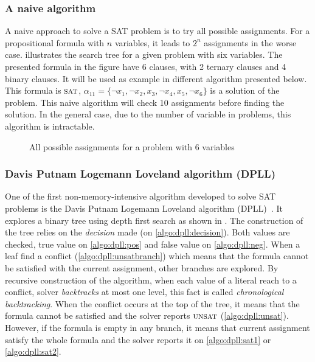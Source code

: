 \subsubsection{A naive algorithm}
A naive approach to solve a SAT problem is to try all possible assignments.
For a propositional formula with $n$ variables, it leads to $2^n$ assignments in the worse case.  
 illustrates the search tree for a given problem with six variables.
The presented formula in the figure have 6 clauses, with 2 ternary clauses and 4 binary clauses.
It will be used as example in different algorithm presented below. This formula is $\textsc{sat}$,
$\alpha_{11} = \{\neg x_1, \neg x_2, x_3, \neg x_4, x_5, \neg x_6 \}$ is a solution of the problem.
This naive algorithm will check 10 assignments before finding the solution. 
In the general case, due to the number of variable in problems, this algorithm is intractable.

\begin{figure}[!htbp]
 \centering
 
 \caption{All possible assignments for a problem with 6 variables}
 \label{fig:naive_algo}
\end{figure}

\subsubsection{Davis Putnam Logemann Loveland algorithm (DPLL)}\label{sec:dpll}
One of the first non-memory-intensive algorithm developed to solve SAT problems is 
the Davis Putnam Logemann Loveland algorithm (DPLL)~\cite{dpll_62}. 
It explores a binary tree using depth first search as shown in .
The construction of the tree  relies on the \emph{decision} made (on \cref{algo:dpll:decision}). Both values
are checked, true value on \cref{algo:dpll:pos} and false value on \cref{algo:dpll:neg}.
When a leaf find a conflict (\cref{algo:dpll:unsatbranch}) which means that the formula cannot be satisfied with
the current assignment, other branches are explored.
By recursive construction of the algorithm, when each value of a literal reach to a conflict,
solver \emph{backtracks} at most one level, this fact is called \emph{chronological backtracking}.
When the conflict occurs at the top of the tree, it means that the formula cannot be satisfied and the 
solver reports $\textsc{unsat}$ (\cref{algo:dpll:unsat}). However, if the formula is empty in any branch, 
it means that current assignment satisfy the whole formula and the solver reports it on \cref{algo:dpll:sat1}
or \ref{algo:dpll:sat2}.

